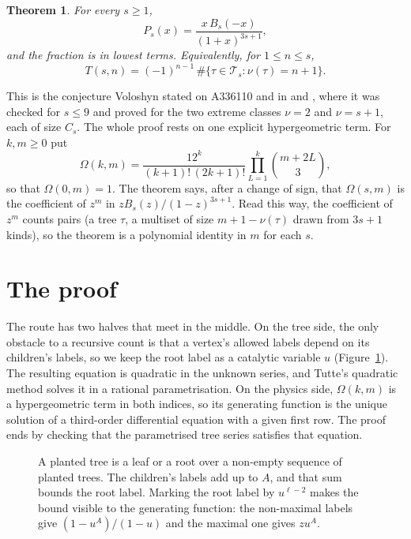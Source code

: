 \documentclass[11pt]{amsart}
\newtheorem{theorem}{Theorem}
\theoremstyle{remark}
\newcommand{\Om}{\Omega}
\begin{document}
\begin{theorem}\label{thm:main}
For every $s \ge 1$,
\[
  P_s(x) = \frac{x\,B_s(-x)}{(1+x)^{3s+1}},
\]
and the fraction is in lowest terms. Equivalently, for $1 \le n \le s$,
\[
  T(s,n) = (-1)^{n-1}\,\#\{\tau \in \mathcal T_s : \nu(\tau) = n+1\}.
\]
\end{theorem}

This is the conjecture Voloshyn stated on A336110 and in \cite[\S4.6]{V1} and \cite[\S3.7]{V2}, where it was
checked for $s \le 9$ and proved for the two extreme classes $\nu = 2$ and $\nu = s+1$, each of size $C_s$. The
whole proof rests on one explicit hypergeometric term. For $k, m \ge 0$ put
\[
  \Om(k,m) = \frac{12^k}{(k+1)!\,(2k+1)!}\prod_{L=1}^{k}\binom{m+2L}{3},
\]
so that $\Om(0,m) = 1$. The theorem says, after a change of sign, that $\Om(s,m)$ is the coefficient of $z^m$ in
$z B_s(z)/(1-z)^{3s+1}$. Read this way, the coefficient of $z^m$ counts pairs (a tree $\tau$, a multiset of size
$m+1-\nu(\tau)$ drawn from $3s+1$ kinds), so the theorem is a polynomial identity in $m$ for each $s$.

\section{The proof}

The route has two halves that meet in the middle. On the tree side, the only obstacle to a recursive count is that
a vertex's allowed labels depend on its children's labels, so we keep the root label as a catalytic variable $u$
(Figure~\ref{fig:cat}). The resulting equation is quadratic in the unknown series, and Tutte's quadratic method
solves it in a rational parametrisation. On the physics side, $\Om(k,m)$ is a hypergeometric term in both indices,
so its generating function is the unique solution of a third-order differential equation with a given first row.
The proof ends by checking that the parametrised tree series satisfies that equation.

\begin{figure}[ht]
\centering
{}
\caption{A planted tree is a leaf or a root over a non-empty sequence of planted trees. The children's labels add
up to $A$, and that sum bounds the root label. Marking the root label by $u^{\ell-2}$ makes the bound visible to the
generating function: the non-maximal labels give $(1-u^{A})/(1-u)$ and the maximal one gives $zu^{A}$.}
\label{fig:cat}
\end{figure}
\end{document}
